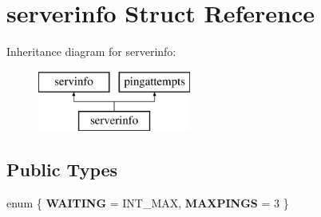 \hypertarget{structserverinfo}{}\section{serverinfo Struct Reference}
\label{structserverinfo}
Inheritance diagram for serverinfo\+:\begin{figure}[H]
\begin{center}
\leavevmode
\includegraphics[height=2.000000cm]{structserverinfo}
\end{center}
\end{figure}
\subsection*{Public Types}
\begin{DoxyCompactItemize}
\item 
\mbox{\label{structserverinfo_a5585931216e80e7b5e23c596291c018e}} 
enum \{ {\bfseries W\+A\+I\+T\+I\+NG} = I\+N\+T\+\_\+\+M\+AX, 
{\bfseries M\+A\+X\+P\+I\+N\+GS} = 3
 \}
\end{DoxyCompactItemize}
